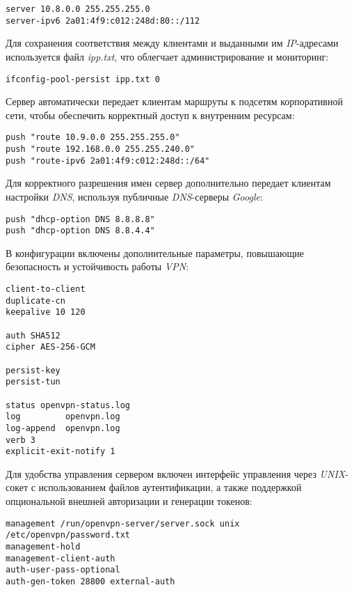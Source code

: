 \begin{lstlisting}
server 10.8.0.0 255.255.255.0
server-ipv6 2a01:4f9:c012:248d:80::/112
\end{lstlisting}

Для сохранения соответствия между клиентами и выданными им \textit{IP}-адресами используется файл \textit{ipp.txt}, что облегчает администрирование и мониторинг:

\begin{lstlisting}
ifconfig-pool-persist ipp.txt 0
\end{lstlisting}

Сервер автоматически передает клиентам маршруты к подсетям корпоративной сети, чтобы обеспечить корректный доступ к внутренним ресурсам:

\begin{lstlisting}
push "route 10.9.0.0 255.255.255.0"
push "route 192.168.0.0 255.255.240.0"
push "route-ipv6 2a01:4f9:c012:248d::/64"
\end{lstlisting}

Для корректного разрешения имен сервер дополнительно передает клиентам настройки \textit{DNS}, используя публичные \textit{DNS}-серверы \textit{Google}:

\begin{lstlisting}
push "dhcp-option DNS 8.8.8.8"
push "dhcp-option DNS 8.8.4.4"
\end{lstlisting}

В конфигурации включены дополнительные параметры, повышающие безопасность и устойчивость работы \textit{VPN}:

\begin{lstlisting}
client-to-client
duplicate-cn
keepalive 10 120

auth SHA512
cipher AES-256-GCM

persist-key
persist-tun

status openvpn-status.log
log         openvpn.log
log-append  openvpn.log
verb 3
explicit-exit-notify 1
\end{lstlisting}

Для удобства управления сервером включен интерфейс управления через \textit{UNIX}-сокет с использованием файлов аутентификации, а также поддержкой опциональной внешней авторизации и генерации токенов:

\begin{lstlisting}
management /run/openvpn-server/server.sock unix /etc/openvpn/password.txt
management-hold
management-client-auth
auth-user-pass-optional
auth-gen-token 28800 external-auth
\end{lstlisting}


